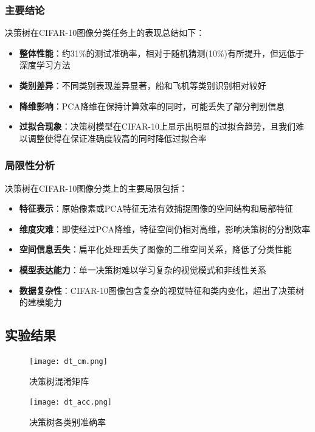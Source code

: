 \documentclass[UTF8]{report}
\theoremstyle{MyLineTheoremStyle} %
\theoremstyle{MyBlockTheoremStyle} %
\theoremstyle{MySubsubsectionStyle} %
\begin{document}
\subsubsection{主要结论}
决策树在CIFAR-10图像分类任务上的表现总结如下：
\begin{itemize}
    \item \textbf{整体性能}：约31\%的测试准确率，相对于随机猜测(10\%)有所提升，但远低于深度学习方法
    \item \textbf{类别差异}：不同类别表现差异显著，船和飞机等类别识别相对较好
    \item \textbf{降维影响}：PCA降维在保持计算效率的同时，可能丢失了部分判别信息
    \item \textbf{过拟合现象}：决策树模型在CIFAR-10上显示出明显的过拟合趋势，且我们难以调整使得在保证准确度较高的同时降低过拟合率
\end{itemize}

\subsubsection{局限性分析}
决策树在CIFAR-10图像分类上的主要局限包括：
\begin{itemize}
    \item \textbf{特征表示}：原始像素或PCA特征无法有效捕捉图像的空间结构和局部特征
    \item \textbf{维度灾难}：即使经过PCA降维，特征空间仍相对高维，影响决策树的分割效率
    \item \textbf{空间信息丢失}：扁平化处理丢失了图像的二维空间关系，降低了分类性能
    \item \textbf{模型表达能力}：单一决策树难以学习复杂的视觉模式和非线性关系
    \item \textbf{数据复杂性}：CIFAR-10图像包含复杂的视觉特征和类内变化，超出了决策树的建模能力
\end{itemize}
\subsection{实验结果}

\begin{figure}[H]
    \centering
    \texttt{[image: dt\_cm.png]}
    \caption{决策树混淆矩阵}
    \label{fig:dt_confusion_matrix}
\end{figure}

\begin{figure}[H]
    \centering
    \texttt{[image: dt\_acc.png]}
    \caption{决策树各类别准确率}
    \label{fig:dt_class_accuracy}
\end{figure}
\end{document}
